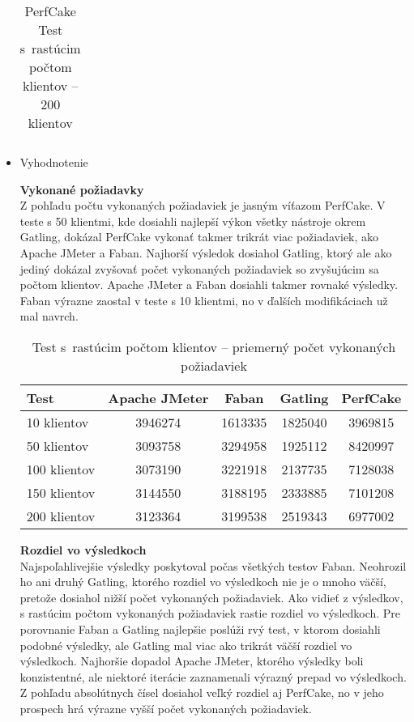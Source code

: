 \documentclass[12pt,oneside,final]{fithesis-utf8}
\begin{document}
\begin{itemize}
\begin{table}[H]
\begin{center}
\begin{tabular}{ | l | c | c | c | c |}
\end{tabular}
\end{center}
\caption{PerfCake Test s~rastúcim počtom klientov -- 200 klientov}
\end{table}

\item Vyhodnotenie

\textbf{Vykonané požiadavky}\\
Z pohľadu počtu vykonaných požiadaviek je jasným víťazom PerfCake. V teste s 50 klientmi, kde dosiahli najlepší výkon všetky nástroje okrem Gatling, dokázal PerfCake vykonať takmer trikrát viac požiadaviek, ako Apache JMeter a Faban. Najhorší výsledok dosiahol Gatling, ktorý ale ako jediný dokázal zvyšovať počet vykonaných požiadaviek so zvyšujúcim sa počtom klientov. Apache JMeter a Faban dosiahli takmer rovnaké výsledky. Faban výrazne zaostal v teste s 10 klientmi, no v ďalších modifikáciach už mal navrch.

\begin{table}[H]
\begin{center}
\begin{tabular}{ | l | c | c | c | c |}
		\hline
		 \textbf{Test} & \textbf{Apache JMeter} & \textbf{Faban} & \textbf{Gatling} & \textbf{PerfCake} \\ \hline
		 10 klientov & 3946274 & 1613335 & 1825040 & 3969815 \\ \hline
 		 50 klientov & 3093758 & 3294958 & 1925112 & 8420997 \\ \hline
 		 100 klientov & 3073190 & 3221918 & 2137735 & 7128038 \\ \hline
 		 150 klientov & 3144550 & 3188195 & 2333885 & 7101208 \\ \hline
		 200 klientov & 3123364 & 3199538 & 2519343 & 6977002 \\ \hline
		 
\end{tabular}
\end{center}
\caption{Test s~rastúcim počtom klientov -- priemerný počet vykonaných požiadaviek}
\end{table}

\textbf{Rozdiel vo výsledkoch}\\
Najspoľahlivejšie výsledky poskytoval počas všetkých testov Faban. Neohrozil ho ani druhý Gatling, ktorého rozdiel vo výsledkoch nie je o mnoho väčší, pretože dosiahol nižší počet vykonaných požiadaviek. Ako vidieť z výsledkov, s rastúcim počtom vykonaných požiadaviek rastie rozdiel vo výsledkoch. Pre porovnanie Faban a Gatling najlepšie poslúži rvý test, v ktorom dosiahli podobné výsledky, ale Gatling mal viac ako trikrát väčší rozdiel vo výsledkoch. Najhoršie dopadol Apache JMeter, ktorého výsledky boli konzistentné, ale niektoré iterácie zaznamenali výrazný prepad vo výsledkoch. Z pohľadu absolútnych čísel dosiahol veľký rozdiel aj PerfCake, no v jeho prospech hrá výrazne vyšší počet vykonaných požiadaviek.


\end{itemize}
\end{document}

